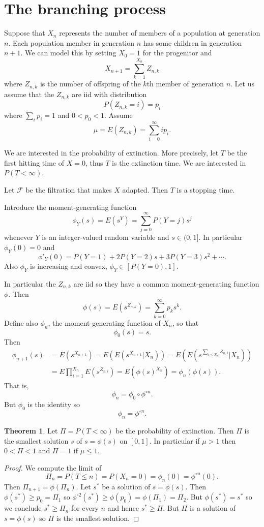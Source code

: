 \documentclass[12pt]{book}
\theoremstyle{definition}
\newtheorem{theorem}{Theorem}[chapter]
\begin{document}
\section{The branching process}
Suppose that $X_n$ represents the number of members of a population at generation $n$.
Each population member in generation $n$ has some children in generation $n + 1$.
We can model this by setting $X_0 = 1$ for the progenitor and
$$X_{n+1} = \sum_{k=1}^{X_n} Z_{n,k}$$
where $Z_{n,k}$ is the number of offspring of the $k$th member of generation $n$.
Let us assume that the $Z_{n,k}$ are iid with distribution
$$P(Z_{n,k} = i) = p_i$$
where $\sum_i p_i = 1$ and $0 < p_0 < 1$.
Assume
$$\mu = E(Z_{n,k}) = \sum_{i=0}^\infty ip_i.$$

We are interested in the probability of extinction.
More precisely, let $T$ be the first hitting time of $X = 0$, thus $T$ is the extinction time.
We are interested in $P(T < \infty)$.

Let $\mathcal F$ be the filtration that makes $X$ adapted.
Then $T$ is a stopping time.

Introduce the moment-generating function
$$\phi_Y(s) = E(s^Y) = \sum_{j=0}^\infty P(Y = j)s^j$$
whenever $Y$ is an integer-valued random variable and $s \in (0, 1]$.
In particular $\phi_Y(0) = 0$ and
$$\phi'_Y(0) = P(Y = 1) + 2P(Y = 2)s + 3P(Y = 3)s^2 + \cdots.$$
Also $\phi_Y$ is increasing and convex, $\phi_Y \in [P(Y = 0), 1]$.

In particular the $Z_{n,k}$ are iid so they have a common moment-generating function $\phi$.
Then
$$\phi(s) = E(s^{Z_{n,k}}) = \sum_{k=0}^\infty p_k s^k.$$
Define also $\phi_n$, the moment-generating function of $X_n$, so that
$$\phi_0(s) = s.$$
Then
\begin{align*}
\phi_{n+1}(s) &= E(s^{X_{n+1}}) = E(E(s^{X_{n+1}}|X_n)) = E(E(s^{\sum_{i \leq X_n} Z_{n,i}}|X_n))\\
&= E\prod_{i=1}^{X_n} E(s^{Z_{n,i}}) = E(\phi(s)^{X_n}) = \phi_n(\phi(s)).
\end{align*}
That is,
$$\phi_n = \phi_0 \circ \phi^{\circ n}.$$
But $\phi_0$ is the identity so
$$\phi_n = \phi^{\circ n}.$$

\begin{theorem}
Let $\Pi = P(T < \infty)$ be the probability of extinction.
Then $\Pi$ is the smallest solution $s$ of $s = \phi(s)$ on $[0, 1]$.
In particular if $\mu > 1$ then $0 < \Pi < 1$ and $\Pi = 1$ if $\mu \leq 1$.
\end{theorem}
\begin{proof}
We compute the limit of
$$\Pi_n = P(T \leq n) = P(X_n = 0) = \phi_n(0) = \phi^{\circ n}(0).$$
Then $\Pi_{n+1} = \phi(\Pi_n)$.
Let $s^*$ be a solution of $s = \phi(s)$.
Then $\phi(s^*) \geq p_0 = \Pi_1$ so $\phi^{\circ 2}(s^*) \geq \phi(p_0) = \phi(\Pi_1) = \Pi_2$.
But $\phi(s^*) = s^*$ so we conclude $s^* \geq \Pi_n$ for every $n$ and hence $s^* \geq \Pi$.
But $\Pi$ is a solution of $s = \phi(s)$ so $\Pi$ is the smallest solution.
\end{proof}
\end{document}
